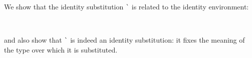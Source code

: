 \documentclass[authoryear, acmsmall, screen, review, nonacm]{acmart}
\begin{document}
\begin{code}%
\>[0]\AgdaSpace{}%
\AgdaSymbol{:}\AgdaSpace{}%
%
\>[4240I]\AgdaSymbol{\{}\AgdaSpace{}%
\AgdaSpace{}%
\AgdaSymbol{\}(}\AgdaSpace{}%
\AgdaSymbol{:}\AgdaSpace{}%
\AgdaSpace{}%
\AgdaSpace{}%
\AgdaSymbol{)\{}\AgdaSpace{}%
\AgdaSymbol{:}\AgdaSpace{}%
\AgdaSpace{}%
\AgdaSpace{}%
\AgdaSymbol{\}\{}\AgdaSpace{}%
\AgdaSymbol{:}\AgdaSpace{}%
\AgdaSpace{}%
\AgdaSpace{}%
\AgdaSymbol{\}}\AgdaSpace{}%
\<%
\\
\>[.][@{}l@{}]\<[4240I]%
\>[10]\AgdaSpace{}%
\AgdaSpace{}%
\AgdaSpace{}%
%
\>[21]\AgdaSpace{}%
\AgdaSpace{}%
\AgdaSpace{}%
\AgdaSpace{}%
\AgdaSpace{}%
\AgdaSpace{}%
\AgdaSymbol{(}\AgdaSpace{}%
\AgdaSpace{}%
\AgdaSymbol{)}\<%
\end{code}
\begin{code}[hide]%
\>[0]\AgdaSpace{}%
\AgdaSymbol{=}\AgdaSpace{}%
\AgdaSpace{}%
\AgdaSymbol{\AgdaUnderscore{}}\<%
\end{code}

We show that the identity substitution \verb!`! is related to the identity environment:

\begin{code}%
\>[0]\AgdaSpace{}%
\AgdaSymbol{:}\AgdaSpace{}%
\AgdaSpace{}%
\AgdaSymbol{\{}\AgdaSymbol{\}}\AgdaSpace{}%
%
\>[17]\AgdaSpace{}%
\AgdaSpace{}%
\AgdaSpace{}%
\AgdaSymbol{(}\AgdaSpace{}%
\AgdaSymbol{\{}\AgdaSymbol{\})}\<%
\\
\>[0]\AgdaSpace{}%
\AgdaSpace{}%
\AgdaSymbol{=}\AgdaSpace{}%
\AgdaSpace{}%
\<%
\end{code}


\Ni and also show that \verb!`! is indeed an identity substitution: it fixes the meaning of the type over which it is substituted.
\end{document}
